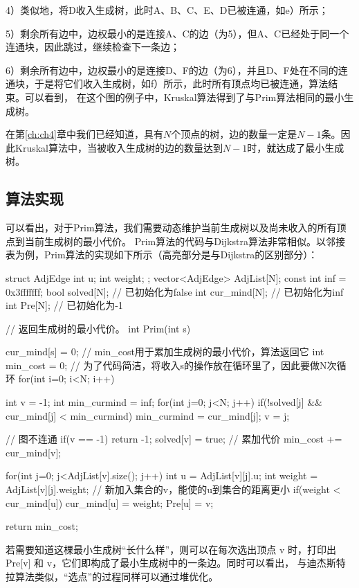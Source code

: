 4）类似地，将D收入生成树，此时A、B、C、E、D已被连通，如e）所示；

5）剩余所有边中，边权最小的是连接A、C的边（为5），但A、C已经处于同一个连通块，因此跳过，继续检查下一条边；

6）剩余所有边中，边权最小的是连接D、F的边（为6），并且D、F处在不同的连通块，于是将它们收入生成树，如f）所示，此时所有顶点均已被连通，算法结束。可以看到，
在这个图的例子中，Kruskal算法得到了与Prim算法相同的最小生成树。

在第\ref{ch:ch4}章中我们已经知道，具有$N$个顶点的树，边的数量一定是$N-1$条。因此Kruskal算法中，当被收入生成树的边的数量达到$N-1$时，就达成了最小生成树。

\subsection{算法实现}
可以看出，对于Prim算法，我们需要动态维护当前生成树以及尚未收入的所有顶点到当前生成树的最小代价。
Prim算法的代码与Dijkstra算法非常相似。以邻接表为例，Prim算法的实现如下所示（高亮部分是与Dijkstra的区别部分）：
\begin{cppcodeHighlight}[15,33,39-40]
    struct AdjEdge {
        int u;
        int weight;
    };
    vector<AdjEdge> AdjList[N];
    const int inf = 0x3fffffff;
    bool solved[N]; // 已初始化为false
    int cur_mind[N];    // 已初始化为inf
    int Pre[N];     // 已初始化为-1

    // 返回生成树的最小代价。
    int Prim(int s) {
        cur_mind[s] = 0;
        // min_cost用于累加生成树的最小代价，算法返回它
        int min_cost = 0;
        // 为了代码简洁，将收入s的操作放在循环里了，因此要做N次循环
        for(int i=0; i<N; i++) {
            int v = -1;
            int min_curmind = inf;
            for(int j=0; j<N; j++) {
                if(!solved[j] && cur_mind[j] < min_curmind) {
                    min_curmind = cur_mind[j];
                    v = j;
                }
            }

            // 图不连通
            if(v == -1) {
                return -1;
            }
            solved[v] = true;
            // 累加代价
            min_cost += cur_mind[v];
            
            for(int j=0; j<AdjList[v].size(); j++) {
                int u = AdjList[v][j].u;
                int weight = AdjList[v][j].weight;
                // 新加入集合的v，能使的u到集合的距离更小
                if(weight < cur_mind[u]) {
                    cur_mind[u] = weight;
                    Pre[u] = v;
                }
            }
        }
        return min_cost;
    }
\end{cppcodeHighlight}
若需要知道这棵最小生成树“长什么样”，则可以在每次选出顶点 v 时，打印出 Pre[v] 和 v，它们即构成了最小生成树中的一条边。同时可以看出，
与迪杰斯特拉算法类似，“选点”的过程同样可以通过堆优化。\\


